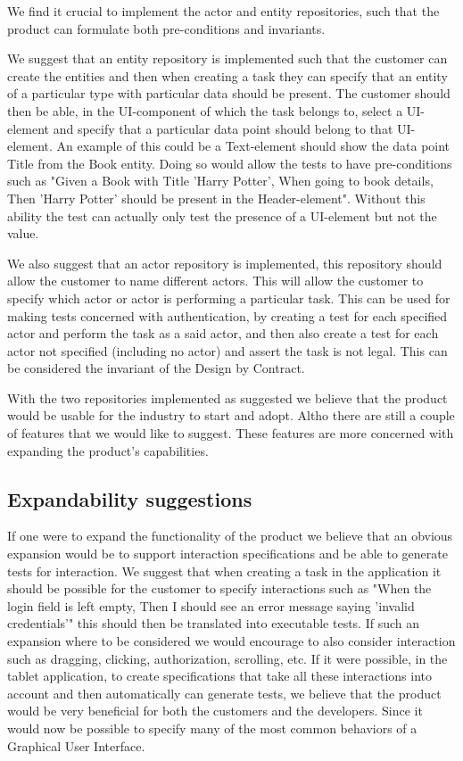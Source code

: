 We find it crucial to implement the actor and entity repositories, such that the product can formulate both pre-conditions and invariants.

We suggest that an entity repository is implemented such that the customer can create the entities and then when creating a task they can specify that an entity of a particular type with particular data should be present.
The customer should then be able, in the UI-component of which the task belongs to, select a UI-element and specify that a particular data point should belong to that UI-element.
An example of this could be a Text-element should show the data point Title from the Book entity.
Doing so would allow the tests to have pre-conditions such as "Given a Book with Title 'Harry Potter', When going to book details, Then 'Harry Potter' should be present in the Header-element".
Without this ability the test can actually only test the presence of a UI-element but not the value.

We also suggest that an actor repository is implemented, this repository should allow the customer to name different actors.
This will allow the customer to specify which actor or actor is performing a particular task.
This can be used for making tests concerned with authentication, by creating a test for each specified actor and perform the task as a said actor, and then also create a test for each actor not specified (including no actor) and assert the task is not legal.
This can be considered the invariant of the Design by Contract.

With the two repositories implemented as suggested we believe that the product would be usable for the industry to start and adopt.
Altho there are still a couple of features that we would like to suggest.
These features are more concerned with expanding the product's capabilities.

\subsection{Expandability suggestions}
If one were to expand the functionality of the product we believe that an obvious expansion would be to support interaction specifications and be able to generate tests for interaction.
We suggest that when creating a task in the application it should be possible for the customer to specify interactions such as "When the login field is left empty, Then I should see an error message saying 'invalid credentials'" this should then be translated into executable tests. 
If such an expansion where to be considered we would encourage to also consider interaction such as dragging, clicking, authorization, scrolling, etc.
If it were possible, in the tablet application, to create specifications that take all these interactions into account and then automatically can generate tests, we believe that the product would be very beneficial for both the customers and the developers.
Since it would now be possible to specify many of the most common behaviors of a Graphical User Interface.

